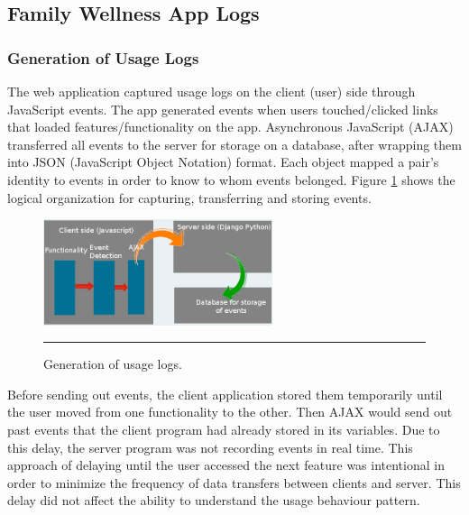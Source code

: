 \subsection{Family Wellness App Logs}
\subsubsection{Generation of Usage Logs}
The web application captured usage logs on the client (user) side through JavaScript events. The app generated events when users touched/clicked links that loaded features/functionality on the app. Asynchronous JavaScript (AJAX) transferred all events to the server for storage on a database, after wrapping them into JSON (JavaScript Object Notation) format. Each object mapped a pair's identity to events in order to know to whom events belonged. Figure \ref{figure:events_logs} shows the logical organization for capturing, transferring and storing events.
\begin{figure}[htbp]
  \centering
    \includegraphics[width=0.6\textwidth]{Figures/events_capture.png}
    \rule{35em}{0.5pt}
  \caption{Generation of usage logs.}
  \label{figure:events_logs}
\end{figure}
Before sending out events, the client application stored them temporarily   until the user moved from one functionality to the other. Then AJAX would send out past events that the client program had already stored in its variables. Due to this delay, the server program was not recording events in real time. This approach of delaying until the user accessed the next feature was intentional in order to minimize the frequency of data transfers between clients and server. This delay did not affect the ability to understand the usage behaviour pattern. 


